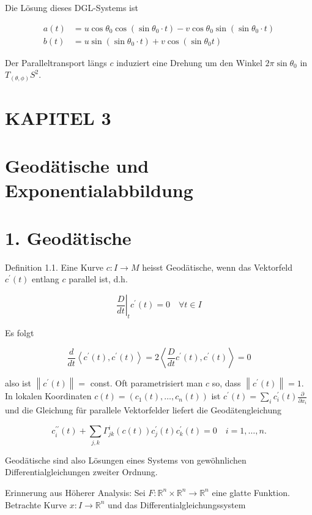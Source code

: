 \documentclass[10pt, letterpaper]{article}
\begin{document}
Die Lösung dieses DGL-Systems ist

$$
\begin{aligned}
a(t) & =u \cos \theta_{0} \cos \left(\sin \theta_{0} \cdot t\right)-v \cos \theta_{0} \sin \left(\sin \theta_{0} \cdot t\right) \\
b(t) & =u \sin \left(\sin \theta_{0} \cdot t\right)+v \cos \left(\sin \theta_{0} t\right)
\end{aligned}
$$

Der Paralleltransport längs $c$ induziert eine Drehung um den Winkel $2 \pi \sin \theta_{0}$ in $T_{(\theta, \phi)} S^{2}$.

\section*{KAPITEL 3}
\section*{Geodätische und Exponentialabbildung}
\section*{1. Geodätische}
Definition 1.1. Eine Kurve $c: I \rightarrow M$ heisst Geodätische, wenn das Vektorfeld $c^{\prime}(t)$ entlang $c$ parallel ist, d.h.

$$
\left.\frac{D}{d t}\right|_{t} c^{\prime}(t)=0 \quad \forall t \in I
$$

Es folgt

$$
\frac{d}{d t}\left\langle c^{\prime}(t), c^{\prime}(t)\right\rangle=2\left\langle\frac{D}{d t} c^{\prime}(t), c^{\prime}(t)\right\rangle=0
$$

also ist $\left\|c^{\prime}(t)\right\|=$ const. Oft parametrisiert man $c$ so, dass $\left\|c^{\prime}(t)\right\|=1$.\\
In lokalen Koordinaten $c(t)=\left(c_{1}(t), \ldots, c_{n}(t)\right)$ ist $c^{\prime}(t)=\sum_{i} c_{i}^{\prime}(t) \frac{\partial}{\partial x_{i}}$ und die Gleichung für parallele Vektorfelder liefert die Geodätengleichung

$$
c_{i}^{\prime \prime}(t)+\sum_{j, k} \Gamma_{j k}^{i}(c(t)) c_{j}^{\prime}(t) c_{k}^{\prime}(t)=0 \quad i=1, \ldots, n .
$$

Geodätische sind also Lösungen eines Systems von gewöhnlichen Differentialgleichungen zweiter Ordnung.

Erinnerung aus Höherer Analysis: Sei $F: \mathbb{R}^{n} \times \mathbb{R}^{n} \rightarrow \mathbb{R}^{n}$ eine glatte Funktion. Betrachte Kurve $x: I \rightarrow \mathbb{R}^{n}$ und das Differentialgleichungssystem
\end{document}
